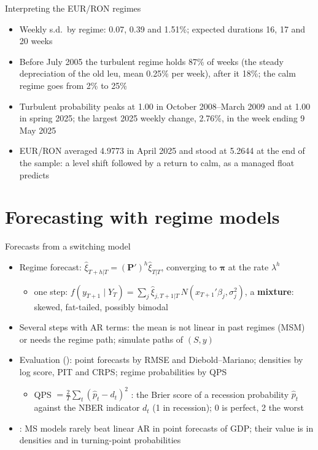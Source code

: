 \begin{frame}{Interpreting the EUR/RON regimes}
\itemsize{\small}
\begin{itemize}
    \item Weekly s.d.\ by regime: 0.07, 0.39 and 1.51\%; expected durations 16, 17 and 20 weeks
    \item Before July 2005 the turbulent regime holds 87\% of weeks (the steady depreciation of the old leu, mean 0.25\% per week), after it 18\%; the calm regime goes from 2\% to 25\%
    \item Turbulent probability peaks at 1.00 in October 2008--March 2009 and at 1.00 in spring 2025; the largest 2025 weekly change, 2.76\%, in the week ending 9 May 2025
    \item EUR/RON averaged 4.9773 in April 2025 and stood at 5.2644 at the end of the sample: a level shift followed by a return to calm, as a managed float predicts
\end{itemize}
\end{frame}


\section{Forecasting with regime models}

\begin{frame}{Forecasts from a switching model}
\itemsize{\small}
\begin{itemize}
    \item Regime forecast: $\hat\xi_{T+h|T} = (\mathbf{P}')^h\hat\xi_{T|T}$, converging to $\boldsymbol\pi$ at the rate $\lambda^h$
    \begin{itemize}
        \item one step: $f(y_{T+1} \mid Y_T) = \sum_j \hat\xi_{j,T+1|T}\,N(x_{T+1}'\beta_j, \sigma_j^2)$, a \textbf{mixture}: skewed, fat-tailed, possibly bimodal
    \end{itemize}
    \item Several steps with AR terms: the mean is not linear in past regimes (MSM) or needs the regime path; simulate paths of $(S, y)$
    \item Evaluation (): point forecasts by RMSE and Diebold--Mariano; densities by log score, PIT and CRPS; regime probabilities by QPS
    \begin{itemize}
        \item QPS $= \frac2T\sum_t(\hat p_t - d_t)^2$ : the Brier score of a recession probability $\hat p_t$ against the NBER indicator $d_t$ (1 in recession); 0 is perfect, 2 the worst
    \end{itemize}
    \item {}: MS models rarely beat linear AR in point forecasts of GDP; their value is in densities and in turning-point probabilities
\end{itemize}
\end{frame}

